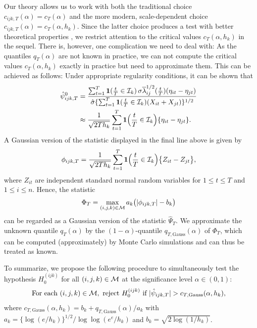 \documentclass[a4paper,12pt]{article}
\numberwithin{equation}{section}
\begin{document}
Our theory allows us to work with both the traditional choice $c_{ijk,T}(\alpha) = c_T(\alpha)$ and the more modern, scale-dependent choice $c_{ijk,T}(\alpha) = c_T(\alpha,h_k)$. Since the latter choice produces a test with better theoretical properties \citep[cp.][]{DuembgenSpokoiny2001}, we restrict attention to the critical values $c_T(\alpha,h_k)$ in the sequel. There is, however, one complication we need to deal with: As the quantiles $q_T(\alpha)$ are not known in practice, we can not compute the critical values $c_T(\alpha,h_k)$ exactly in practice but need to approximate them. This can be achieved as follows: Under appropriate regularity conditions, it can be shown that 
\begin{align*}
\hat{\psi}_{ijk,T}^0 
 & = \frac{\sum\nolimits_{t=1}^T \boldsymbol{1}(\frac{t}{T} \in \mathcal{I}_k) \, \sigma \overline{\lambda}_{ij}^{1/2}(\frac{t}{T}) (\eta_{it} - \eta_{jt})}{ \hat{\sigma} \{ \sum\nolimits_{t=1}^T \boldsymbol{1}(\frac{t}{T} \in \mathcal{I}_k) (X_{it} + X_{jt}) \}^{1/2}} \\
 & \approx \frac{1}{\sqrt{2Th_k}} \sum\limits_{t=1}^T \boldsymbol{1}\Big(\frac{t}{T} \in \mathcal{I}_k\Big) \{ \eta_{it} - \eta_{jt} \}.
\end{align*} 
A Gaussian version of the statistic displayed in the final line above is given by 
\begin{equation*}
\phi_{ijk,T} = \frac{1}{\sqrt{2Th_k}} \sum\limits_{t=1}^T \boldsymbol{1}\Big(\frac{t}{T} \in \mathcal{I}_k\Big) \big\{ Z_{it} - Z_{jt} \big\},
\end{equation*}
where $Z_{it}$ are independent standard normal random variables for $1 \le t \le T$ and $1 \le i \le n$. Hence, the statistic 
\[ \Phi_T = \max_{(i,j,k) \in \mathcal{M}} a_k \big( |\phi_{ijk,T}| - b_k \big) \]
can be regarded as a Gaussian version of the statistic $\hat{\Psi}_T$. We approximate the unknown quantile $q_T(\alpha)$ by the $(1-\alpha)$-quantile $q_{T,\text{Gauss}}(\alpha)$ of $\Phi_T$, which can be computed (approximately) by Monte Carlo simulations and can thus be treated as known. 


To summarize, we propose the following procedure to simultaneously test the hypothesis $H_0^{(ijk)}$ for all $(i,j,k) \in \mathcal{M}$ at the significance level $\alpha \in (0,1)$: 
\begin{equation}\label{eq:test}
\text{For each } (i,j,k) \in \mathcal{M}, \text{ reject } H_0^{(ijk)} \text{ if } |\hat{\psi}_{ijk,T}| > c_{T,\text{Gauss}}(\alpha,h_k),
\end{equation}
where $c_{T,\text{Gauss}}(\alpha,h_k) = b_k + q_{T,\text{Gauss}}(\alpha)/a_k$ with $a_k = \{\log(e/h_k)\}^{1/2} / \log \log(e^e / h_k)$ and $b_k = \sqrt{2 \log(1/h_k)}$. 
\end{document}
